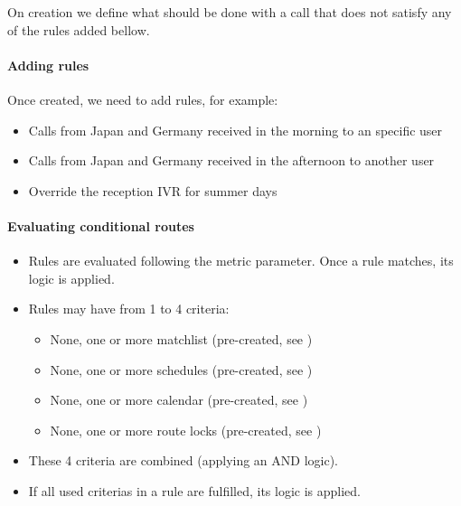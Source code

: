 \documentclass[letterpaper,10pt,english]{sphinxmanual}
\begin{document}
On creation we define what should be done with a call that does not satisfy any
of the rules added bellow.


\paragraph{Adding rules}
\label{administration_portal/client/vpbx/routing_endpoints/conditional_routes:adding-rules}
Once created, we need to add rules, for example:
\begin{itemize}
\item {} 
Calls from Japan and Germany received in the morning to an specific user

\item {} 
Calls from Japan and Germany received in the afternoon to another user

\item {} 
Override the reception IVR for summer days

\end{itemize}


\paragraph{Evaluating conditional routes}
\label{administration_portal/client/vpbx/routing_endpoints/conditional_routes:evaluating-conditional-routes}\begin{itemize}
\item {} 
Rules are evaluated following the metric parameter. Once a rule matches, its
logic is applied.

\item {} 
Rules may have from 1 to 4 criteria:
\begin{itemize}
\item {} 
None, one or more matchlist (pre-created, see {\hyperref[administration_portal/client/vpbx/routing_tools/match_lists:match\string-lists]{}})

\item {} 
None, one or more schedules (pre-created, see {\hyperref[administration_portal/client/vpbx/routing_tools/schedules:schedules]{}})

\item {} 
None, one or more calendar (pre-created, see {\hyperref[administration_portal/client/vpbx/routing_tools/calendars:calendars]{}})

\item {} 
None, one or more route locks (pre-created, see {\hyperref[administration_portal/client/vpbx/routing_tools/route_locks:route\string-locks]{}})

\end{itemize}

\item {} 
These 4 criteria are combined (applying an AND logic).

\item {} 
If all used criterias in a rule are fulfilled, its logic is applied.

\end{itemize}
\end{document}
